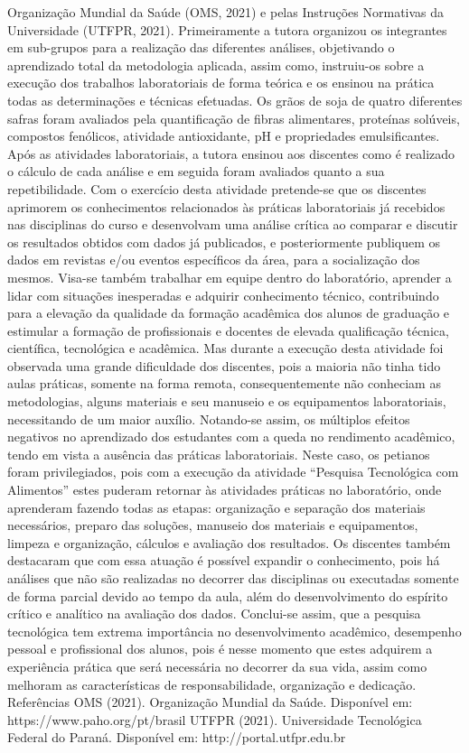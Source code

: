 Organização Mundial da Saúde (OMS, 2021) e pelas Instruções Normativas da Universidade 
(UTFPR, 2021). Primeiramente a tutora organizou os integrantes em sub-grupos para a 
realização das diferentes análises, objetivando o aprendizado total da metodologia aplicada, 
assim como, instruiu-os sobre a execução dos trabalhos laboratoriais de forma teórica e os 
ensinou na prática todas as determinações e técnicas efetuadas. Os grãos de soja de quatro 
diferentes safras foram avaliados pela quantificação de fibras alimentares, proteínas solúveis, 
compostos fenólicos, atividade antioxidante, pH e propriedades emulsificantes. Após as 
atividades laboratoriais, a tutora ensinou aos discentes como é realizado o cálculo de cada análise 
e em seguida foram avaliados quanto a sua repetibilidade. Com o exercício desta atividade 
pretende-se que os discentes aprimorem os conhecimentos relacionados às práticas laboratoriais 
já recebidos nas disciplinas do curso e desenvolvam uma análise crítica ao comparar e discutir os 
resultados obtidos com dados já publicados, e posteriormente publiquem os dados em revistas 
e/ou eventos específicos da área, para a socialização dos mesmos. Visa-se também trabalhar em 
equipe dentro do laboratório, aprender a lidar com situações inesperadas e adquirir conhecimento 
técnico, contribuindo para a elevação da qualidade da formação acadêmica dos alunos de 
graduação e estimular a formação de profissionais e docentes de elevada qualificação técnica, 
científica, tecnológica e acadêmica. Mas durante a execução desta atividade foi observada uma 
grande dificuldade dos discentes, pois a maioria não tinha tido aulas práticas, somente na forma 
remota, consequentemente não conheciam as metodologias, alguns materiais e seu manuseio e os 
equipamentos laboratoriais, necessitando de um maior auxílio. Notando-se assim, os múltiplos 
efeitos negativos no aprendizado dos estudantes com a queda no rendimento acadêmico, tendo 
em vista a ausência das práticas laboratoriais. Neste caso, os petianos foram privilegiados, pois 
com a execução da atividade “Pesquisa Tecnológica com Alimentos” estes puderam retornar às 
atividades práticas no laboratório, onde aprenderam fazendo todas as etapas: organização e 
separação dos materiais necessários, preparo das soluções, manuseio dos materiais e 
equipamentos, limpeza e organização, cálculos e avaliação dos resultados. Os discentes também 
destacaram que com essa atuação é possível expandir o conhecimento, pois há análises que não 
são realizadas no decorrer das disciplinas ou executadas somente de forma parcial devido ao 
tempo da aula, além do desenvolvimento do espírito crítico e analítico na avaliação dos dados. 
Conclui-se assim, que a pesquisa tecnológica tem extrema importância no desenvolvimento 
acadêmico, desempenho pessoal e profissional dos alunos, pois é nesse momento que estes 
adquirem a experiência prática que será necessária no decorrer da sua vida, assim como 
melhoram as características de responsabilidade, organização e dedicação. 
Referências 
OMS (2021). Organização Mundial da Saúde. Disponível em: https://www.paho.org/pt/brasil
UTFPR (2021). Universidade Tecnológica Federal do Paraná. Disponível em: 
http://portal.utfpr.edu.br

